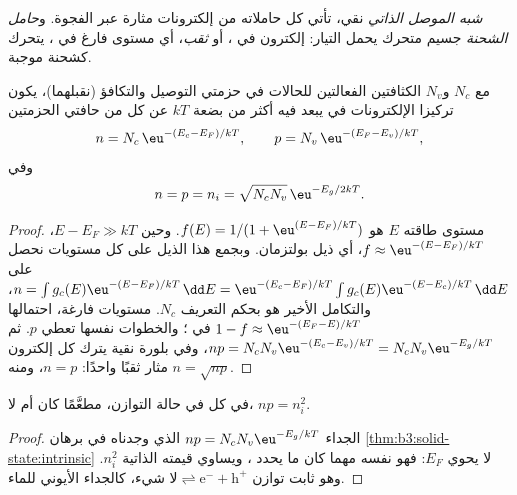 \begin{definition}\label{def:b3:solid-state:carriers}
\emph{شبه الموصل الذاتي} 
نقي، تأتي كل حاملاته من إلكترونات مثارة عبر الفجوة. 
و\emph{حامل الشحنة} جسيم متحرك يحمل
التيار: إلكترون في ، أو \emph{ثقب}، أي
مستوى فارغ في ، يتحرك كشحنة موجبة.
\end{definition}

\begin{theorem}\label{thm:b3:solid-state:intrinsic}
مع $N_c$ و$N_v$ الكثافتين الفعالتين للحالات في حزمتي التوصيل 
والتكافؤ (نقبلهما)، يكون تركيزا الإلكترونات  في 
يبعد  فيه أكثر من بضعة $kT$ عن كل من حافتي الحزمتين
\[
  n = N_c\,\eu^{-(E_c - E_F)/kT}, \qquad p = N_v\,\eu^{-(E_F - E_v)/kT},
\]
وفي 
\[
  n = p = n_i = \sqrt{N_cN_v}\,\eu^{-E_g/2kT}.
\]
\end{theorem}

\begin{proof}
 مستوى طاقته $E$ هو $f(E) = 1/(1 + \eu^{(E - E_F)/kT})$. وحين
$E - E_F \gg kT$، $f \approx \eu^{-(E - E_F)/kT}$، أي ذيل بولتزمان. وبجمع هذا الذيل على كل مستويات  نحصل على $n = \int g_c(E)\eu^{-(E - E_F)/kT}\,\dd E = \eu^{-(E_c - E_F)/kT}\int g_c(E)\eu^{-(E - E_c)/kT}\,\dd E$، والتكامل الأخير هو بحكم
التعريف $N_c$.  مستويات فارغة، احتمالها $1 - f \approx \eu^{-(E_F - E)/kT}$ في
؛ والخطوات نفسها تعطي $p$. ثم $np = N_cN_v\eu^{-(E_c - E_v)/kT} = N_cN_v\eu^{-E_g/kT}$، وفي بلورة نقية
يترك كل إلكترون مثار ثقبًا واحدًا: $n = p$، ومنه $n = \sqrt{np}$.
\end{proof}

\begin{proposition}\label{prop:b3:solid-state:mass-action}
في كل  في حالة التوازن، مطعَّمًا كان أم لا، $np = n_i^2$.
\end{proposition}

\begin{proof}
الجداء $np = N_cN_v\eu^{-E_g/kT}$ الذي وجدناه في برهان
\cref{thm:b3:solid-state:intrinsic} لا يحوي $E_F$: فهو نفسه مهما كان ما
يحدد ، ويساوي قيمته الذاتية $n_i^2$. وهو
ثابت توازن $\text{لا شيء} \rightleftharpoons \mathrm e^- + \mathrm h^+$، كالجداء الأيوني للماء.
\end{proof}

